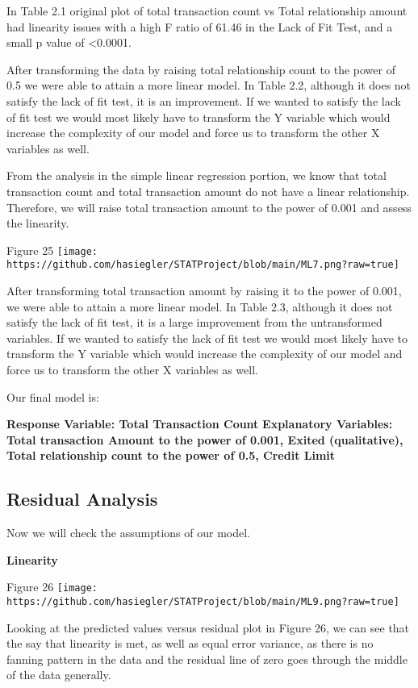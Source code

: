 \documentclass[
]{article}
\begin{document}
In Table 2.1 original plot of total transaction count vs Total
relationship amount had linearity issues with a high F ratio of 61.46 in
the Lack of Fit Test, and a small p value of \textless0.0001.

After transforming the data by raising total relationship count to the
power of 0.5 we were able to attain a more linear model. In Table 2.2,
although it does not satisfy the lack of fit test, it is an improvement.
If we wanted to satisfy the lack of fit test we would most likely have
to transform the Y variable which would increase the complexity of our
model and force us to transform the other X variables as well.

From the analysis in the simple linear regression portion, we know that
total transaction count and total transaction amount do not have a
linear relationship. Therefore, we will raise total transaction amount
to the power of 0.001 and assess the linearity.

Figure 25
\texttt{[image: https://github.com/hasiegler/STATProject/blob/main/ML7.png?raw=true]}

After transforming total transaction amount by raising it to the power
of 0.001, we were able to attain a more linear model. In Table 2.3,
although it does not satisfy the lack of fit test, it is a large
improvement from the untransformed variables. If we wanted to satisfy
the lack of fit test we would most likely have to transform the Y
variable which would increase the complexity of our model and force us
to transform the other X variables as well.

Our final model is:

\textbf{Response Variable: Total Transaction Count} \textbf{Explanatory
Variables: Total transaction Amount to the power of 0.001, Exited
(qualitative), Total relationship count to the power of 0.5, Credit
Limit}

\hypertarget{residual-analysis-1}{%
\subsection{Residual Analysis}\label{residual-analysis-1}}

Now we will check the assumptions of our model.

\textbf{Linearity}

Figure 26
\texttt{[image: https://github.com/hasiegler/STATProject/blob/main/ML9.png?raw=true]}

Looking at the predicted values versus residual plot in Figure 26, we
can see that the say that linearity is met, as well as equal error
variance, as there is no fanning pattern in the data and the residual
line of zero goes through the middle of the data generally.
\end{document}

